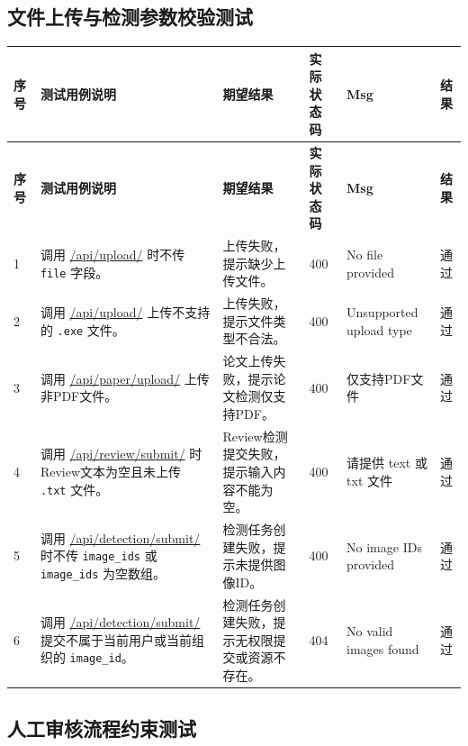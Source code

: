 \documentclass[UTF8,a4paper,12pt]{ctexart}
\newcommand{\pass}{通过}
\begin{document}
\subsection{文件上传与检测参数校验测试}

\begin{longtable}{|P{0.8cm}|P{4.2cm}|P{4.0cm}|P{1.4cm}|P{4.3cm}|P{1.0cm}|}
\hline
\textbf{序号} & \textbf{测试用例说明} & \textbf{期望结果} & \textbf{实际状态码} & \textbf{Msg} & \textbf{结果} \\
\hline
\endfirsthead

\hline
\textbf{序号} & \textbf{测试用例说明} & \textbf{期望结果} & \textbf{实际状态码} & \textbf{Msg} & \textbf{结果} \\
\hline
\endhead

1 & 调用 \url{/api/upload/} 时不传 \texttt{file} 字段。 & 上传失败，提示缺少上传文件。 & 400 & No file provided & \pass \\
\hline

2 & 调用 \url{/api/upload/} 上传不支持的 \texttt{.exe} 文件。 & 上传失败，提示文件类型不合法。 & 400 & Unsupported upload type & \pass \\
\hline

3 & 调用 \url{/api/paper/upload/} 上传非PDF文件。 & 论文上传失败，提示论文检测仅支持PDF。 & 400 & 仅支持PDF文件 & \pass \\
\hline

4 & 调用 \url{/api/review/submit/} 时Review文本为空且未上传 \texttt{.txt} 文件。 & Review检测提交失败，提示输入内容不能为空。 & 400 & 请提供 text 或 txt 文件 & \pass \\
\hline

5 & 调用 \url{/api/detection/submit/} 时不传 \texttt{image\_ids} 或 \texttt{image\_ids} 为空数组。 & 检测任务创建失败，提示未提供图像ID。 & 400 & No image IDs provided & \pass \\
\hline

6 & 调用 \url{/api/detection/submit/} 提交不属于当前用户或当前组织的 \texttt{image\_id}。 & 检测任务创建失败，提示无权限提交或资源不存在。 & 404 & No valid images found & \pass \\
\hline

\end{longtable}

\subsection{人工审核流程约束测试}
\end{document}
